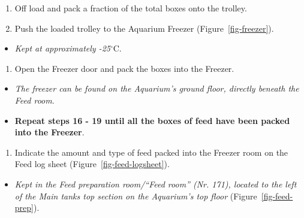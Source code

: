 \documentclass[
  12pt,
]{report}
\providecommand{\tightlist}{%
  \setlength{\itemsep}{0pt}\setlength{\parskip}{0pt}}\usepackage{longtable,booktabs,array}
\begin{document}
\begin{enumerate}
\def\labelenumi{\arabic{enumi}.}
\setcounter{enumi}{16}
\tightlist
\item
  Off load and pack a fraction of the total boxes onto the trolley.
\item
  Push the loaded trolley to the Aquarium Freezer
  (Figure~\ref{fig-freezer}).
\end{enumerate}

\begin{itemize}
\tightlist
\item
  \emph{Kept at approximately -25}\(^\circ\)C.
\end{itemize}

\begin{enumerate}
\def\labelenumi{\arabic{enumi}.}
\setcounter{enumi}{18}
\tightlist
\item
  Open the Freezer door and pack the boxes into the Freezer.
\end{enumerate}

\begin{itemize}
\item
  \emph{The freezer can be found on the Aquarium's ground floor,
  directly beneath the Feed room}.
\item
  \textbf{Repeat steps 16 - 19 until all the boxes of feed have been
  packed into the Freezer}.
\end{itemize}

\begin{enumerate}
\def\labelenumi{\arabic{enumi}.}
\setcounter{enumi}{19}
\tightlist
\item
  Indicate the amount and type of feed packed into the Freezer room on
  the Feed log sheet (Figure~\ref{fig-feed-logsheet}).
\end{enumerate}

\begin{itemize}
\tightlist
\item
  \emph{Kept in the Feed preparation room/``Feed room'' (Nr. 171),
  located to the left of the Main tanks top section on the Aquarium's
  top floor} (Figure~\ref{fig-feed-prep}).
\end{itemize}
\end{document}
